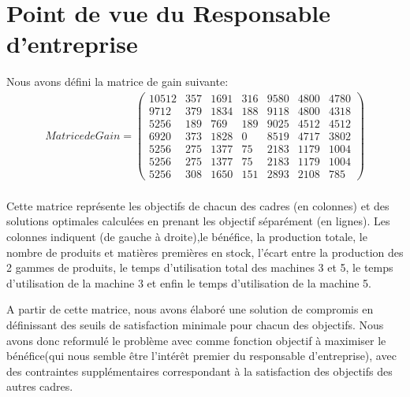 \documentclass[12pt]{article}
\begin{document}
\section{Point de vue du Responsable d'entreprise}
Nous avons défini la matrice de gain suivante:
\begin{align*}
Matrice de Gain =
 \begin{pmatrix}
    10512    &357   &1691    &316   &9580   &4800   &4780\\
    9712     &379   &1834    &188   &9118   &4800   &4318\\
    5256    &189    &769    &189     &9025   &4512   &4512\\
    6920    &373   &1828    &0       &8519    &4717   &3802\\
    5256    &275   &1377    &75     &2183    &1179   &1004\\
    5256    &275   &1377   &75     &2183    &1179   &1004\\
    5256    &308   &1650    &151   &2893    &2108    &785
 \end{pmatrix}
\end{align*}\\

Cette matrice représente les objectifs de chacun des cadres (en colonnes) et des solutions optimales calculées en prenant les objectif séparément (en lignes). Les colonnes indiquent (de gauche à droite),le bénéfice, la production totale, le nombre de produits et matières premières en stock, l'écart entre la production des 2 gammes de produits, le temps d'utilisation total des machines 3 et 5, le temps d'utilisation de la machine 3 et enfin le temps d'utilisation de la machine 5.

A partir de cette matrice, nous avons élaboré une solution de compromis en définissant des seuils de satisfaction minimale pour chacun des objectifs. Nous avons donc reformulé le problème avec comme fonction objectif à maximiser le bénéfice(qui nous semble être l'intérêt premier du responsable d'entreprise), avec des contraintes supplémentaires correspondant à la satisfaction des objectifs des autres cadres. 
\end{document}
